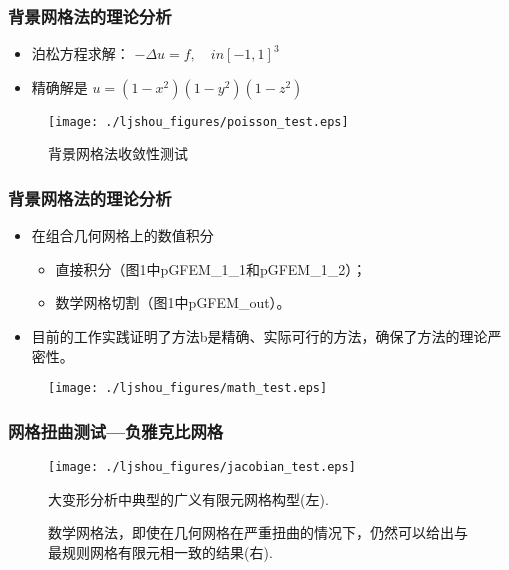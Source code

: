 \documentclass[mathserif]{beamer}
\begin{document}
\begin{CJK}{UTF8}{gkai}
	
\begin{frame}
	\frametitle{背景网格法的理论分析}
	\begin{itemize}
		\item 泊松方程求解：
			$-\Delta u = f, \quad in [-1, 1]^3$
		\item 精确解是
			$u = (1-x^2)(1-y^2)(1-z^2)$
	\end{itemize}
		\begin{figure}
		\centering
		\texttt{[image: ./ljshou\_figures/poisson\_test.eps]}
		\caption{背景网格法收敛性测试}
	\end{figure}
\end{frame}

\begin{frame}
	\frametitle{背景网格法的理论分析}
	\begin{itemize}
		\item 在组合几何网格上的数值积分
		\begin{itemize}
			\item 直接积分（图1中pGFEM\_1\_1和pGFEM\_1\_2）；
			\item 数学网格切割（图1中pGFEM\_out）。
		\end{itemize}
		\item 目前的工作实践证明了方法b是精确、实际可行的方法，确保了方法的理论严密性。
	\end{itemize}
		\begin{figure}
				\centering
				\texttt{[image: ./ljshou\_figures/math\_test.eps]}
		\end{figure}
\end{frame}

\begin{frame}
	\frametitle{网格扭曲测试---负雅克比网格}
	\begin{figure}
		\centering
		\texttt{[image: ./ljshou\_figures/jacobian\_test.eps]}
		\caption{大变形分析中典型的广义有限元网格构型(左).}
		\caption{数学网格法，即使在几何网格在严重扭曲的情况下，仍然可以给出与最规则网格有限元相一致的结果(右). }
	\end{figure}
\end{frame}


\end{CJK}
\end{document}
